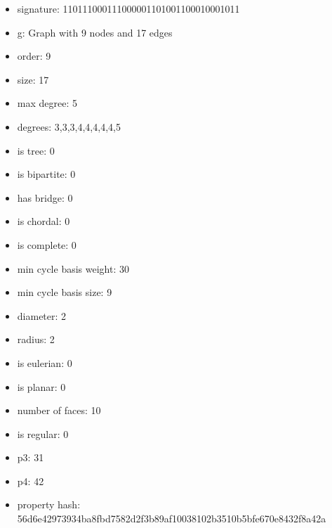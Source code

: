 \newpage
\begin{figure}
\end{figure}
\begin{itemize}
\item signature: 110111000111000001101001100010001011
\item g: Graph with 9 nodes and 17 edges
\item order: 9
\item size: 17
\item max degree: 5
\item degrees: 3,3,3,4,4,4,4,4,5
\item is tree: 0
\item is bipartite: 0
\item has bridge: 0
\item is chordal: 0
\item is complete: 0
\item min cycle basis weight: 30
\item min cycle basis size: 9
\item diameter: 2
\item radius: 2
\item is eulerian: 0
\item is planar: 0
\item number of faces: 10
\item is regular: 0
\item p3: 31
\item p4: 42
\item property hash: 56d6e42973934ba8fbd7582d2f3b89af10038102b3510b5bfe670e8432f8a42a
\end{itemize}
